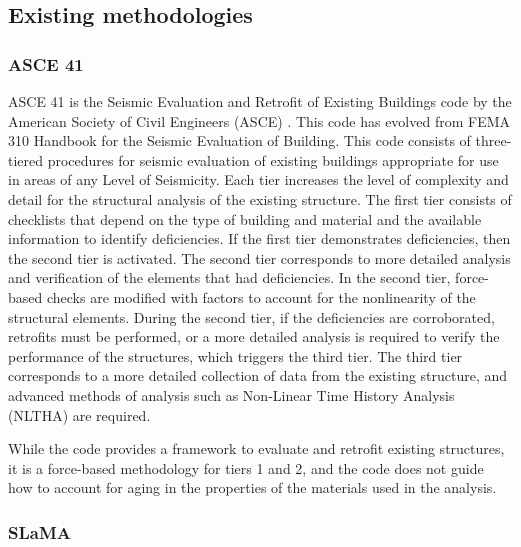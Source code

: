 \subsection{Existing methodologies}

\subsubsection{ASCE 41}

ASCE 41 is the Seismic Evaluation and Retrofit of Existing Buildings code by the American Society of Civil Engineers (ASCE) \cite{ASCE-41-2017}. This code has evolved from FEMA 310 Handbook for the Seismic Evaluation of Building. This code consists of three-tiered procedures for seismic evaluation of existing buildings appropriate for use in areas of any Level of Seismicity. Each tier increases the level of complexity and detail for the structural analysis of the existing structure. The first tier consists of checklists that depend on the type of building and material and the available information to identify deficiencies. If the first tier demonstrates deficiencies, then the second tier is activated. The second tier corresponds to more detailed analysis and verification of the elements that had deficiencies. In the second tier, force-based checks are modified with factors to account for the nonlinearity of the structural elements. During the second tier, if the deficiencies are corroborated, retrofits must be performed, or a more detailed analysis is required to verify the performance of the structures, which triggers the third tier. The third tier corresponds to a more detailed collection of data from the existing structure, and advanced methods of analysis such as Non-Linear Time History Analysis (NLTHA) are required.

While the code provides a framework to evaluate and retrofit existing structures, it is a force-based methodology for tiers 1 and 2, and the code does not guide how to account for aging in the properties of the materials used in the analysis. 

\subsubsection{SLaMA}

